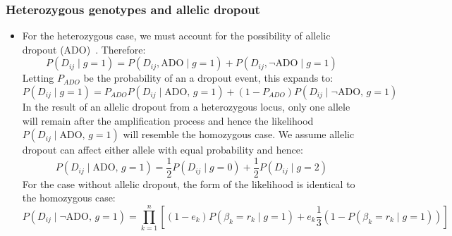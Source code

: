 \documentclass[../../main.tex]{subfiles}
\begin{document}
\subsubsection*{Heterozygous genotypes and allelic dropout}
\begin{itemize}
     \item For the heterozygous case, we must account for the possibility of allelic dropout (ADO)~\cite{monovar,sciphi}. Therefore:
     \begin{equation*}
         P(D_{ij}\mid g=1) = P(D_{ij}, \text{ADO} \mid g=1)+ P(D_{ij}, \neg \text{ADO}\mid g=1)
     \end{equation*}
     Letting $P_{ADO}$ be the probability of an a dropout event, this expands to:
     \begin{equation*}
         P(D_{ij}\mid g=1) = P_{ADO}P(D_{ij}\mid \text{ADO},\, g=1) + (1-P_{ADO})P(D_{ij} \mid \neg \text{ADO},\, g=1)
     \end{equation*}
     In the result of an allelic dropout from a heterozygous locus, only one allele will remain after the amplification process and hence the likelihood $P(D_{ij}\mid \text{ADO},\, g=1)$ will resemble the homozygous case. We assume allelic dropout can affect either  allele with equal probability and hence:
     \begin{equation*}
         P(D_{ij}\mid \text{ADO},\, g=1) =\frac{1}{2}P(D_{ij}\mid g=0) + \frac{1}{2}P(D_{ij}\mid g=2)
     \end{equation*}
     For the case without allelic dropout, the form of the likelihood is identical to the homozygous case:
     \begin{equation*}
           P(D_{ij}\mid \neg\text{ADO},\,g=1) = \prod_{k=1}^n \left[ (1-e_k)P(\beta_k=r_k\mid g=1) + e_k \frac{1}{3} (1-P(\beta_k=r_k\mid g=1)) \right]
     \end{equation*}
\end{itemize}
\end{document}
